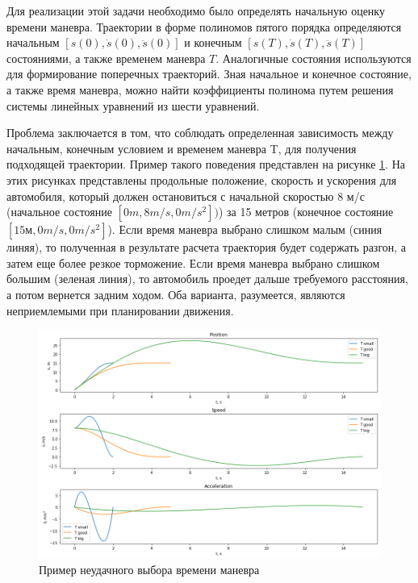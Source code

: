 Для реализации этой задачи необходимо было определять начальную оценку времени маневра. Траектории в форме
полиномов пятого порядка определяются начальным $[s(0), \dot{s}(0), \ddot{s}(0)]$ и конечным 
$[s(T), \dot{s}(T), \ddot{s}(T)]$ состояниями, а также временем маневра $T$. Аналогичные состояния
используются для формирование поперечных траекторий. Зная начальное и конечное состояние, а также время
маневра, можно найти коэффициенты полинома путем решения системы линейных уравнений из шести уравнений.

Проблема заключается в том, что соблюдать определенная зависимость между начальным, конечным условием и 
временем маневра T, для получения подходящей траектории. Пример такого поведения представлен на рисунке
\ref{img:t_choose_bad}. На этих рисунках представлены продольные положение, скорость и ускорения для автомобиля,
который должен остановиться с начальной скоростью 8 м/с (начальное состояние $[0 m, 8 m/s, 0 m/s^2])$) за
15 метров (конечное состояние $[15 м, 0 m/s, 0 m/s^2]$). Если время маневра выбрано слишком малым 
(синия линяя), то полученная в результате расчета траектория будет содержать разгон, а затем еще более резкое торможение. Если время маневра выбрано слишком большим (зеленая линия), то автомобиль проедет дальше
требуемого расстояния, а потом вернется задним ходом. Оба варианта, разумеется, являются неприемлемыми
при планировании движения.

\begin{figure}[h]
    \centering
    \includegraphics[width=1\textwidth]{images/t_choose_bad}
    \caption{Пример неудачного выбора времени маневра}
    \label{img:t_choose_bad}
\end{figure}

